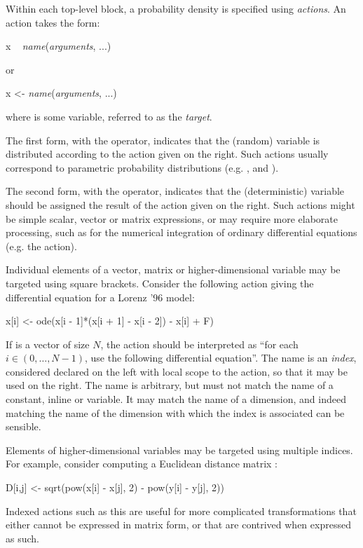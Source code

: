 Within each top-level block, a probability density is specified using
\emph{actions}. An action takes the form:
\begin{bicode}
x ~ \textsl{name}(\textsl{arguments}, ...)
\end{bicode}
or
\begin{bicode}
x <- \textsl{name}(\textsl{arguments}, ...)
\end{bicode}
where  is some variable, referred to as the \emph{target}.

The first form, with the \bitt{\~{}} operator, indicates that the (random)
variable  is distributed according to the action given on the
right. Such actions usually correspond to parametric probability distributions
(e.g.  ,  and ).

The second form, with the \bitt{<-} operator, indicates that the
(deterministic) variable  should be assigned the result of the action
given on the right. Such actions might be simple scalar,
vector or matrix expressions, or may require more
elaborate processing, such as for the numerical integration of ordinary
differential equations (e.g. the
 action).

Individual elements of a vector, matrix or higher-dimensional variable may be
targeted using square brackets. Consider the following action giving the
differential equation for a Lorenz '96 model:
\begin{bicode}
x[i] <- ode(x[i - 1]*(x[i + 1] - x[i - 2]) - x[i] + F)
\end{bicode}
If  is a vector of size $N$, the action should be interpreted as ``for
each $i \in (0,\ldots,N-1)$, use the following differential equation''. The
name  is an \emph{index}, considered declared on the left with local
scope to the action, so that it may be used on the right. The name  is
arbitrary, but must not match the name of a constant, inline or variable. It
may match the name of a dimension, and indeed matching the name of the
dimension with which the index is associated can be sensible.

Elements of higher-dimensional variables may be targeted using multiple
indices. For example, consider computing a Euclidean distance matrix :
\begin{bicode}
D[i,j] <- sqrt(pow(x[i] - x[j], 2) - pow(y[i] - y[j], 2))
\end{bicode}
Indexed actions such as this are useful for more complicated transformations
that either cannot be expressed in matrix form, or that are
contrived when expressed as such.

